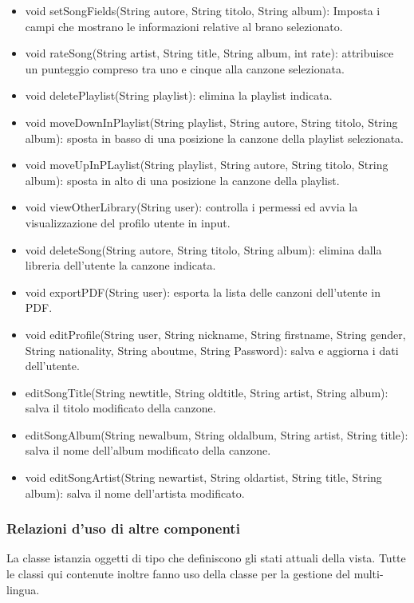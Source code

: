 \begin{itemize}
    \item void setSongFields(String autore, String titolo, String album):
    Imposta i campi che mostrano le informazioni relative al brano selezionato.
    \item void rateSong(String artist, String title, String album, int rate):
    attribuisce un punteggio compreso tra uno e cinque alla canzone selezionata.
    \item void deletePlaylist(String playlist): elimina la playlist
    indicata.
    \item void moveDownInPlaylist(String playlist, String autore, String
    titolo, String album): sposta in basso di una posizione la canzone della
    playlist selezionata.
    \item void moveUpInPLaylist(String playlist, String autore, String titolo,
    String album): sposta in alto di una posizione la canzone della playlist.
    \item
    void viewOtherLibrary(String user): controlla i permessi ed avvia la
    visualizzazione del profilo utente in input.
    \item void deleteSong(String autore, String titolo, String album): elimina
    dalla libreria dell'utente la canzone indicata.
    \item void exportPDF(String user): esporta la lista delle canzoni
    dell'utente in PDF.
    \item void editProfile(String user, String nickname, String firstname,
    String gender, String nationality, String aboutme, String Password):
    salva e aggiorna i dati dell'utente.
    \item editSongTitle(String newtitle, String oldtitle, String artist, String
    album): salva il titolo modificato della canzone.
    \item editSongAlbum(String newalbum, String oldalbum, String artist, String
    title): salva il nome dell'album modificato della canzone.
    \item void editSongArtist(String newartist, String oldartist, String title,
    String album): salva il nome dell'artista modificato.
\end{itemize}
\subsubsection*{Relazioni d'uso di altre componenti}
La classe istanzia oggetti di tipo  che definiscono gli stati
attuali della vista.
Tutte le classi qui contenute inoltre fanno uso della classe 
per la gestione del multi-lingua. 
